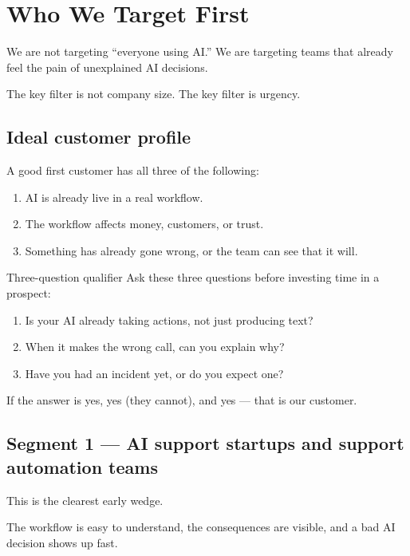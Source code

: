 \chapter{Who We Target First}

We are not targeting ``everyone using AI.''
We are targeting teams that already feel the pain of unexplained AI decisions.

The key filter is not company size.
The key filter is urgency.

\section{Ideal customer profile}

A good first customer has all three of the following:

\begin{enumerate}
  \item AI is already live in a real workflow.
  \item The workflow affects money, customers, or trust.
  \item Something has already gone wrong, or the team can see that it will.
\end{enumerate}

\begin{conceptbox}{Three-question qualifier}
Ask these three questions before investing time in a prospect:

\smallskip
\begin{enumerate}
  \item Is your AI already taking actions, not just producing text?
  \item When it makes the wrong call, can you explain why?
  \item Have you had an incident yet, or do you expect one?
\end{enumerate}

If the answer is yes, yes (they cannot), and yes --- that is our customer.
\end{conceptbox}

\section{Segment 1 --- AI support startups and support automation teams}

This is the clearest early wedge.

The workflow is easy to understand, the consequences are visible, and a bad AI decision shows up fast.


